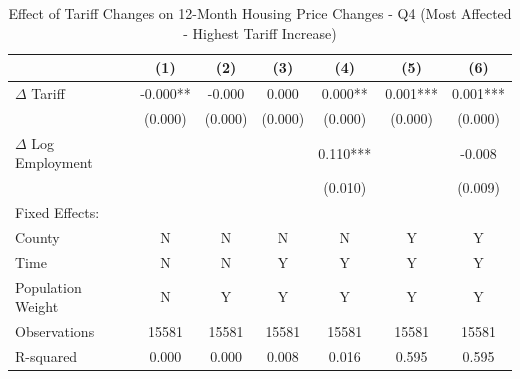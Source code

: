 \begin{table}[htbp]
\centering
\caption{Effect of Tariff Changes on 12-Month Housing Price Changes - Q4 (Most Affected - Highest Tariff Increase)}
\label{tab:tariffs_changes_q4}
\begin{tabular}{lcccccc}
\toprule
{} &       (1) &      (2) &       (3) &       (4) &       (5) &        (6) \\
\midrule
$\Delta$ Tariff  &   -0.000** &    -0.000 &     0.000 &   0.000** &  0.001*** &   0.001*** \\
                 &    (0.000) &   (0.000) &   (0.000) &   (0.000) &   (0.000) &    (0.000) \\
$\Delta$ Log Employment &           &           &           &  0.110*** &           &     -0.008 \\
                 &           &           &           &   (0.010) &           &    (0.009) \\
Fixed Effects:   &           &          &           &           &           &            \\
County           &         N &        N &         N &         N &         Y &          Y \\
Time             &         N &        N &         Y &         Y &         Y &          Y \\
Population Weight &        N &        Y &         Y &         Y &         Y &          Y \\
\midrule
Observations     &     15581 &     15581 &     15581 &     15581 &     15581 &      15581 \\
R-squared        &     0.000 &     0.000 &     0.008 &     0.016 &     0.595 &      0.595 \\
\bottomrule
\end{tabular}
\end{table}